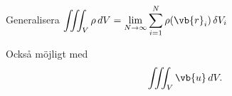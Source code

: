 Generalisera $\displaystyle \iiint_V \rho\,dV = \lim_{N \to \infty} \sum_{i=1}^N \rho(\vb{r}_i)\,\delta V_i$

Också möjligt med
\[ \iiint_V \vb{u}\,dV. \]
